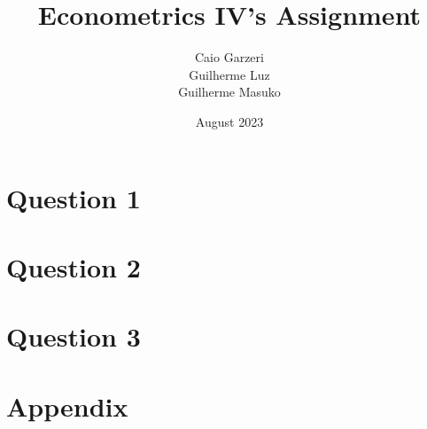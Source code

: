 \documentclass[12pt, a4paper]{article}
\title{Econometrics IV's Assignment}
\author{Caio Garzeri \\
Guilherme Luz \\
Guilherme Masuko}
\date{August 2023}
\begin{document}
\begin{titlepage}
\clearpage
\maketitle
\thispagestyle{empty}
\end{titlepage}

	\section{Question 1} \label{sec:q1}
	
	\section{Question 2} \label{sec:q2}
	
	\section{Question 3} \label{sec:q3}
	
	\newpage
	
	
	\newpage
	\appendix
	\section{Appendix} \label{sec:appendix}
	
\end{document}
